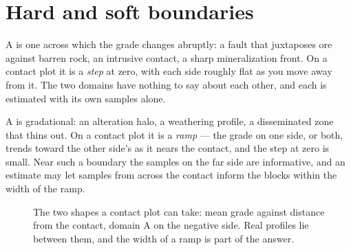 \section{Hard and soft boundaries}\label{sec:contact-hardsoft}
A  is one across which the grade changes abruptly: a fault that juxtaposes ore against barren rock, an intrusive contact, a sharp mineralization front. On a contact plot it is a \emph{step} at zero, with each side roughly flat as you move away from it. The two domains have nothing to say about each other, and each is estimated with its own samples alone.

A  is gradational: an alteration halo, a weathering profile, a disseminated zone that thins out. On a contact plot it is a \emph{ramp} — the grade on one side, or both, trends toward the other side's as it nears the contact, and the step at zero is small. Near such a boundary the samples on the far side are informative, and an estimate may let samples from across the contact inform the blocks within the width of the ramp.

\begin{figure}[htbp]\centering
{}
\caption{The two shapes a contact plot can take: mean grade against distance from the contact, domain A on the negative side. Real profiles lie between them, and the width of a ramp is part of the answer.}\label{fig:contact-shapes}
\end{figure}

